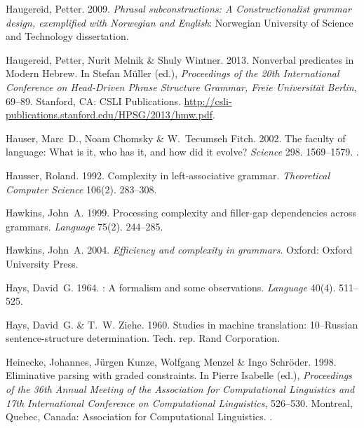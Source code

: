 \begin{thebibliography}{1420}
Haugereid, Petter. 2009.
\newblock \emph{Phrasal subconstructions: {A} {Constructionalist} grammar
  design, exemplified with {Norwegian} and {English}}: Norwegian University of
  Science and Technology dissertation.

Haugereid, Petter, Nurit Melnik \& Shuly Wintner. 2013.
\newblock Nonverbal predicates in {Modern Hebrew}.
\newblock In Stefan M{\"u}ller (ed.), \emph{Proceedings of the {20th
  International Conference on Head-Driven Phrase Structure Grammar, Freie
  Universit{\"a}t Berlin}}, 69--89. Stanford, CA: CSLI Publications.
\newblock
  \urlprefix\url{http://csli-publications.stanford.edu/HPSG/2013/hmw.pdf}.

Hauser, Marc~D., Noam Chomsky \& W.~Tecumseh Fitch. 2002.
\newblock The faculty of language: {What} is it, who has it, and how did it
  evolve?
\newblock \emph{Science} 298. 1569--1579.
\newblock {}.

Hausser, Roland. 1992.
\newblock Complexity in left-associative grammar.
\newblock \emph{Theoretical Computer Science} 106(2). 283--308.

Hawkins, John~A. 1999.
\newblock Processing complexity and filler-gap dependencies across grammars.
\newblock \emph{Language} 75(2). 244--285.

Hawkins, John~A. 2004.
\newblock \emph{Efficiency and complexity in grammars}.
\newblock Oxford: Oxford University Press.

Hays, David~G. 1964.
: {A} formalism and some observations.
\newblock \emph{Language} 40(4). 511--525.

Hays, David~G. \& T.~W. Ziehe. 1960.
\newblock Studies in machine translation: {10--Russian} sentence-structure
  determination.
\newblock Tech. rep. Rand Corporation.

Heinecke, Johannes, J{\"u}rgen Kunze, Wolfgang Menzel \& Ingo Schr{\"o}der.
  1998.
\newblock Eliminative parsing with graded constraints.
\newblock In Pierre Isabelle (ed.), \emph{Proceedings of the 36th {Annual
  Meeting of the Association for Computational Linguistics and 17th
  International Conference on Computational Linguistics}}, 526--530. Montreal,
  Quebec, Canada: Association for Computational Linguistics.
\newblock {}.


\end{thebibliography}
